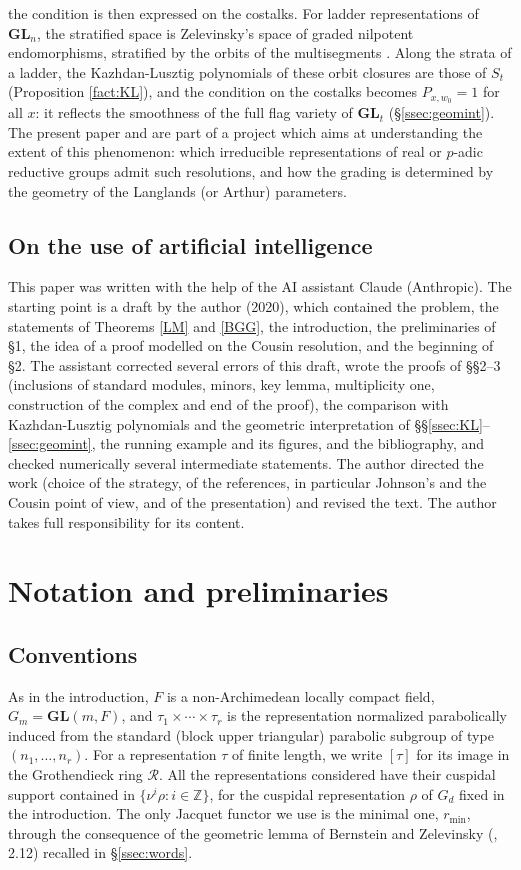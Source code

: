 \documentclass[a4paper,12pt,leqno]{amsart}
\newcommand{\bbZ}{\mathbb{Z}}
\newcommand{\caR}{\mathcal{R}}
\theoremstyle{plain}
\theoremstyle{definition}
\theoremstyle{definition}
\newcommand{\GL}{\mathbf{GL}}
\begin{document}
the condition is then expressed on the costalks. 
For ladder representations of $\GL_n$, the stratified space is Zelevinsky's space of graded
nilpotent endomorphisms, stratified by the orbits of the multisegments \cite{Zel81, Zel85}. Along the
strata of a ladder, the Kazhdan-Lusztig polynomials of these orbit closures are those of $S_t$
(Proposition \ref{fact:KL}), and the condition on the costalks becomes $P_{x,w_0}=1$ for all $x$: it
reflects the smoothness of the full flag variety of $\GL_t$ (\S\ref{ssec:geomint}). The present paper and \cite{Ren26b} are part of a
project which aims at understanding the extent of this phenomenon: which irreducible representations
of real or $p$-adic reductive  groups admit such resolutions, and how the grading is determined by the geometry of the
Langlands (or Arthur)  parameters.

\subsection*{On the use of artificial intelligence}
This paper was written with the help of the AI assistant Claude (Anthropic). The starting point is a
draft by the author (2020), which contained the problem, the statements of Theorems \ref{LM} and
\ref{BGG}, the introduction, the preliminaries of \S1, the idea of a proof modelled on the Cousin
resolution, and the beginning of \S2. The assistant corrected several errors of this draft, wrote the
proofs of \S\S2--3 (inclusions of standard modules, minors, key lemma, multiplicity one, construction
of the complex and end of the proof), the comparison with Kazhdan-Lusztig polynomials and the
geometric interpretation of \S\S\ref{ssec:KL}--\ref{ssec:geomint}, the running example and its figures,
and the bibliography, and checked numerically several intermediate statements. The author directed
the work (choice of the strategy, of the references, in particular Johnson's and the Cousin point of
view, and of the presentation) and revised the text. The author takes full responsibility for its
content.






\section{Notation and preliminaries}
\subsection{Conventions}
As in the introduction, $F$ is a non-Archimedean locally compact field, $G_m=\GL(m,F)$, and
$\tau_1\times\cdots\times\tau_r$ is the representation normalized parabolically induced from the
standard (block upper triangular) parabolic subgroup of type $(n_1,\ldots,n_r)$. For a representation
$\tau$ of finite length, we write $[\tau]$ for its image in the Grothendieck ring $\caR$. All the
representations considered have their cuspidal support contained in $\{\nu^i\rho:i\in\bbZ\}$, for the
cuspidal representation $\rho$ of $G_d$ fixed in the introduction. The only Jacquet functor we use is
the minimal one, $r_{\min}$, through the consequence of the geometric lemma of Bernstein and Zelevinsky
(\cite{BZ77}, 2.12) recalled in \S\ref{ssec:words}.
\end{document}
